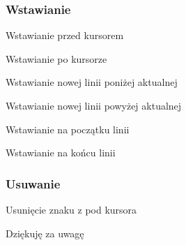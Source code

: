 \documentclass{beamer}
\begin{document}
\begin{frame}
	\frametitle{Wstawianie}
	\begin{description}[<+->]
	\item[i] Wstawianie przed kursorem
	\item[a] Wstawianie po kursorze
	\item[o] Wstawianie nowej linii poniżej aktualnej
	\item[O] Wstawianie nowej linii powyżej aktualnej
	\item[I] Wstawianie na początku linii
	\item[A] Wstawianie na końcu linii
	\end{description}
\end{frame}
\begin{frame}
	\frametitle{Usuwanie}
	\begin{description}[<+->]
		\item[x] Usunięcie znaku z pod kursora
	\end{description}
\end{frame}
\begin{frame}
	Dziękuję za uwagę
\end{frame}
\end{document}
